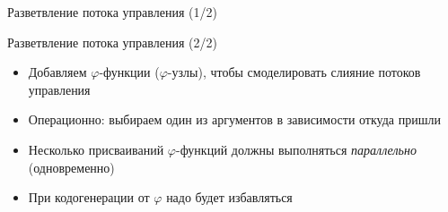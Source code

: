 \documentclass[aspectratio=169
  , xcolor={svgnames}
  , hyperref={ colorlinks,citecolor=DeepPink4
             , linkcolor=DarkRed,urlcolor=DarkBlue}
  , russian
  ]{beamer}
\theoremstyle{exerciseStyle1}
\begin{document}
\begin{frame}[fragile]{Разветвление потока управления (1/2)}
\begin{minipage}[t]{0.48\linewidth}
\begin{figure}

\end{figure}
\end{minipage}\vspace{1em}

\end{frame}

\begin{frame}[fragile]{Разветвление потока управления (2/2)}
\begin{itemize}
\item Добавляем $\varphi$-функции ($\varphi$-узлы), чтобы смоделировать слияние потоков управления

\item Операционно: выбираем один из аргументов в зависимости откуда пришли
\item Несколько присваиваний $\varphi$-функций должны выполняться \emph{параллельно} (одновременно)
\item При кодогенерации от $\varphi$ надо будет избавляться
\end{itemize}

\begin{minipage}[t]{0.52\linewidth}
\begin{figure}

\end{figure}
\end{minipage}

\end{frame}
\end{document}
